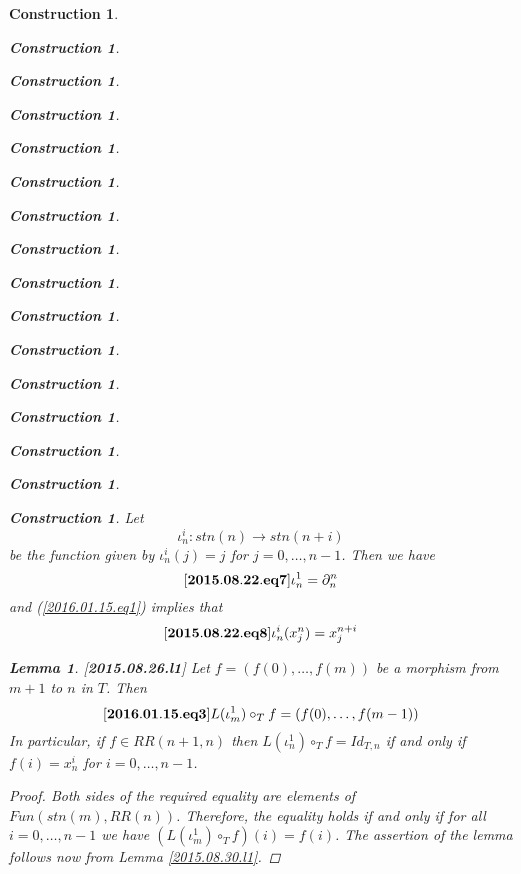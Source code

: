 \documentclass[12pt]{amsart}
\newenvironment{eq}{\begin{equation}}{\end{equation}}
\newtheorem{lemma}[proposition]{Lemma}
\newtheorem{construction}[proposition]{Construction}
\newcommand{\llabel}[1]{\label{#1}[{\bf #1}]}
\newcommand{\sr}{\rightarrow}
\newcommand{\hc}{\circ_{T}}
\begin{document}
\begin{construction}
\begin{construction}
\begin{construction}
\begin{construction}
\begin{construction}
\begin{construction}
\begin{construction}
\begin{construction}
\begin{construction}
\begin{construction}
\begin{construction}
\begin{construction}
\begin{construction}
\begin{construction}
\begin{construction}
\begin{construction}
Let 
%
$${\iota}_n^{i}:stn(n)\sr stn(n+i)$$
%
be the function given by ${\iota}_n^i(j)=j$ for $j=0,\dots,n-1$. Then we have
%
\begin{eq}
\llabel{2015.08.22.eq7}
{\iota}_n^{1}=\partial_{n}^{n}
\end{eq}
%
and (\ref{2016.01.15.eq1}) implies that 
%
\begin{eq}
\llabel{2015.08.22.eq8}
{\iota}_n^i(x^n_j)=x^{n+i}_j
\end{eq}
%
\begin{lemma}
\llabel{2015.08.26.l1}
Let $f=(f(0),\dots,f(m))$ be a morphism from $m+1$ to $n$ in $T$. Then
%
\begin{eq}\llabel{2016.01.15.eq3}
L(\iota_m^1)\hc f=(f(0),\dots,f(m-1))
\end{eq}
%
In particular, if $f\in RR(n+1,n)$ then $L(\iota_n^1)\hc f=Id_{T,n}$ if and only if $f(i)=x_n^i$ for $i=0,\dots,n-1$. 
\end{lemma}
%
\begin{proof}
Both sides of the required equality are elements of $Fun(stn(m),RR(n))$. Therefore, the equality holds if and only if for all $i=0,\dots,n-1$ we have
$(L(\iota_m^1)\hc f)(i)=f(i)$. The assertion of the lemma follows now from Lemma \ref{2015.08.30.l1}.


\end{proof}
\end{construction}
\end{construction}
\end{construction}
\end{construction}
\end{construction}
\end{construction}
\end{construction}
\end{construction}
\end{construction}
\end{construction}
\end{construction}
\end{construction}
\end{construction}
\end{construction}
\end{construction}
\end{construction}
\end{document}
